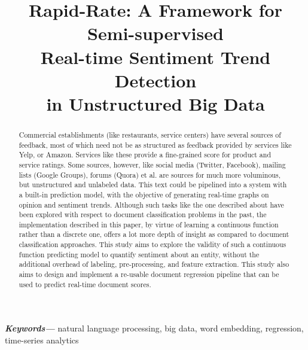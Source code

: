 \documentclass[conference]{IEEEtran}
\begin{document}
\title{Rapid-Rate: A Framework for Semi-supervised \\Real-time Sentiment Trend Detection\\ in Unstructured Big Data}

\author{
}

\maketitle

\begin{abstract}
    Commercial establishments (like restaurants, service centers) have several sources of feedback, most of which need not be as structured as feedback provided by services like Yelp, or Amazon.
    Services like these provide a fine-grained score for product and service ratings.
    Some sources, however, like social media (Twitter, Facebook), mailing lists (Google Groups), forums (Quora) et al. are sources for much more voluminous, but unstructured and unlabeled data. 
    This text could be pipelined into a system with a built-in prediction model, with the objective of generating real-time graphs on opinion and sentiment trends. 
    Although such tasks like the one described about have been explored with respect to document classification problems in the past, the implementation described in this paper, by virtue of learning a continuous function rather than a discrete one, offers a lot more depth of insight as compared to document classification approaches. 
    This study aims to explore the validity of such a continuous function predicting model to quantify sentiment about an entity, without the additional overhead of labeling, pre-processing, and feature extraction.
    This study also aims to design and implement a re-usable document regression pipeline that can be used to predict real-time document scores.
\end{abstract}

\providecommand{\keywords}[1]{\textbf{\textit{Keywords---}} #1}
\keywords{natural language processing, big data, word embedding, regression, time-series analytics}

\IEEEpeerreviewmaketitle
\end{document}
